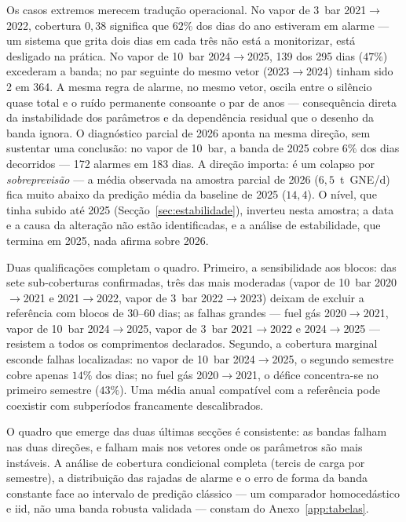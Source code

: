 Os casos extremos merecem tradução operacional. No vapor de 3~bar
2021${\to}$2022, cobertura $0{,}38$ significa que $62\%$ dos dias do ano
estiveram em alarme --- um sistema que grita dois dias em cada três não está a
monitorizar, está desligado na prática. No vapor de 10~bar 2024${\to}$2025,
139 dos 295 dias ($47\%$) excederam a banda; no par seguinte do mesmo vetor
(2023${\to}$2024) tinham sido 2 em 364. A mesma regra de alarme, no mesmo
vetor, oscila entre o silêncio quase total e o ruído permanente consoante o
par de anos --- consequência direta da instabilidade dos parâmetros e da
dependência residual que o desenho da banda ignora. O diagnóstico parcial de
2026 aponta na mesma direção, sem sustentar uma conclusão: no vapor de 10~bar,
a banda de 2025 cobre $6\%$ dos dias decorridos --- 172 alarmes em 183 dias.
A direção importa: é um colapso por \emph{sobreprevisão} --- a média
observada na amostra parcial de 2026 ($6{,}5$~t~GNE/d) fica muito abaixo da
predição média da baseline de 2025 ($14{,}4$). O nível, que tinha subido até
2025 (Secção~\ref{sec:estabilidade}), inverteu nesta amostra; a data e a
causa da alteração não estão identificadas, e a análise de estabilidade,
que termina em 2025, nada afirma sobre 2026.

Duas qualificações completam o quadro. Primeiro, a sensibilidade aos blocos:
das sete sub-coberturas confirmadas, três das mais moderadas (vapor de 10~bar
2020${\to}$2021 e 2021${\to}$2022, vapor de 3~bar 2022${\to}$2023) deixam de
excluir a referência com blocos de 30--60 dias; as falhas grandes ---
fuel gás 2020${\to}$2021, vapor de 10~bar 2024${\to}$2025, vapor de 3~bar
2021${\to}$2022 e 2024${\to}$2025 --- resistem a todos os comprimentos
declarados. Segundo, a cobertura marginal esconde falhas localizadas: no
vapor de 10~bar 2024${\to}$2025, o segundo semestre cobre apenas $14\%$ dos
dias; no fuel gás 2020${\to}$2021, o défice concentra-se no primeiro semestre
($43\%$). Uma média anual compatível com a referência pode coexistir com
subperíodos francamente descalibrados.

O quadro que emerge das duas últimas secções é consistente: as bandas falham
nas duas direções, e falham mais nos vetores onde os parâmetros são mais
instáveis. A análise de cobertura condicional completa (tercis de carga por
semestre), a distribuição das rajadas de alarme e o erro de forma da banda
constante face ao intervalo de predição clássico --- um comparador
homocedástico e iid, não uma banda robusta validada --- constam do
Anexo~\ref{app:tabelas}.

